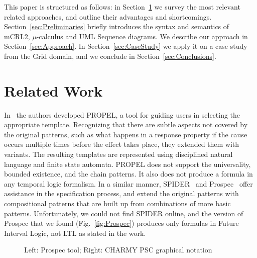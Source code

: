\documentclass[letter]{llncs}
\begin{document}
This paper is structured as follows: in Section~\ref{sec:RelatedWork} we
 survey the most relevant related approaches,
and outline their advantages and shortcomings. Section~\ref{sec:Preliminaries} briefly introduces the
syntax and semantics of mCRL2, $\mu$-calculus and UML Sequence diagrams.
We describe our approach in Section~\ref{sec:Approach}.
In Section~\ref{sec:CaseStudy} we apply it on a case study from the Grid domain, and we conclude in Section~\ref{sec:Conclusions}.
\section{Related Work}
\label{sec:RelatedWork}
In~\cite{Smith02propel:an} the authors developed PROPEL, a tool for guiding users in 
selecting the appropriate template. Recognizing that there are subtle aspects
not covered by the original patterns, such as what happens in a response
property if the cause occurs multiple times before the effect takes place,
they extended them with variants. The resulting templates 
are represented using disciplined natural language and finite state automata. 
PROPEL does not support the universality, bounded existence, and the chain patterns. It also 
does not produce a formula in any temporal logic formalism.
In a similar manner, SPIDER~\cite{konrad2005facilitating} and 
Prospec~\cite{Mondragon_prospec} offer assistance in the specification process, and extend the original patterns
with compositional patterns that are built up from combinations of more basic patterns. 
Unfortunately, we could not find SPIDER online, and the version of Prospec that we found (Fig.~\ref{fig:Prospec}) produces only 
formulas in Future Interval Logic, not LTL as stated in the work.
\begin{figure}[b!]
  \centering
  \hfill
  \caption{Left: Prospec tool; Right: CHARMY PSC graphical notation}
\end{figure}
\end{document}
